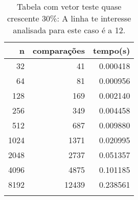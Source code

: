 \begin{table}[ht]
\centering
\begin{tabular}{rrr} \toprule
        n &    comparações &       tempo(s) \\ \midrule
      32  &             41 &      0.000418 \\
      64  &             81 &      0.000956 \\
     128  &            169 &      0.002140 \\
     256  &            349 &      0.004458 \\
     512  &            687 &      0.009880 \\
    1024  &           1371 &      0.020995 \\
    2048  &           2737 &      0.051357 \\
    4096  &           4875 &      0.101185 \\
    8192  &          12439 &      0.238561 \\
\bottomrule\addlinespace
\end{tabular}
\caption{Tabela com vetor teste quase crescente 30\%: A linha te interesse analisada para este caso é a 12.}
\label{tab:quicksortQuaseCresc30}
\end{table}

